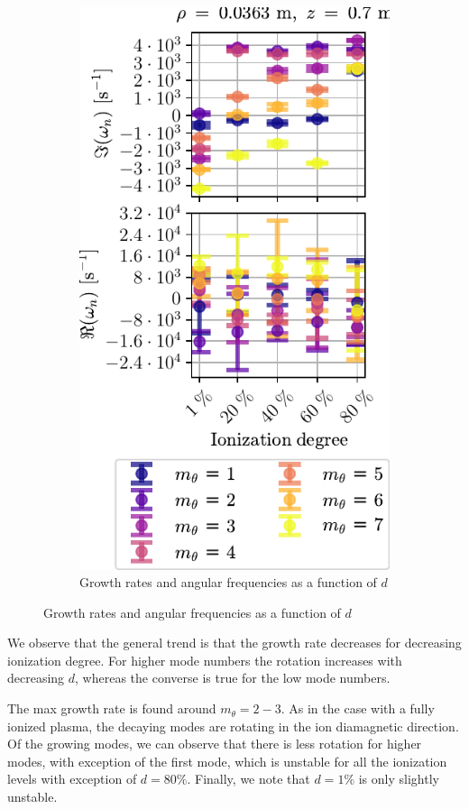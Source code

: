 \begin{figure}[htbp]
\begin{subfigure}[h]{0.45\textwidth}
       \includegraphics{fig/results/neutral/growthRatesNnModes}
       \caption{Growth rates and angular frequencies as a function of $d$}
       \label{fig:grNnModeNr}
    \end{subfigure}
\end{figure}
%
We observe that the general trend is that the growth rate decreases for decreasing ionization degree.
For higher mode numbers the rotation increases with decreasing $d$, whereas the converse is true for the low mode numbers.

The max growth rate is found around $m_\theta=2-3$.
As in the case with a fully ionized plasma, the decaying modes are rotating in the ion diamagnetic direction.
Of the growing modes, we can observe that there is less rotation for higher modes, with exception of the first mode, which is unstable for all the ionization levels with exception of $d=80\%$.
Finally, we note that $d=1\%$ is only slightly unstable.

